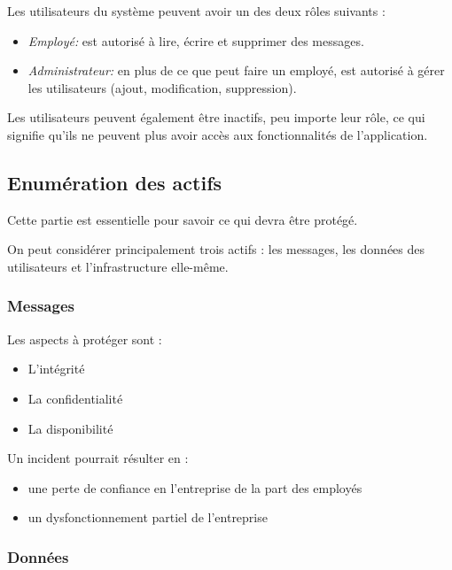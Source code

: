 \documentclass{article}
\begin{document}
Les utilisateurs du système peuvent avoir un des deux rôles suivants :

\begin{itemize}

\item
  \textit{Employé:} est autorisé à lire, écrire et supprimer des
  messages.
\item
  \textit{Administrateur:} en plus de ce que peut faire un employé, est
  autorisé à gérer les utilisateurs (ajout, modification, suppression).
\end{itemize}

Les utilisateurs peuvent également être inactifs, peu importe leur rôle,
ce qui signifie qu'ils ne peuvent plus avoir accès aux fonctionnalités
de l'application.

\subsection{Enumération des actifs}

Cette partie est essentielle pour savoir ce qui devra être protégé.

On peut considérer principalement trois actifs : les messages, les
données des utilisateurs et l'infrastructure elle-même.

\subsubsection{Messages}

Les aspects à protéger sont :

\begin{itemize}

\item
  L'intégrité
\item
  La confidentialité
\item
  La disponibilité
\end{itemize}

Un incident pourrait résulter en :

\begin{itemize}

\item
  une perte de confiance en l'entreprise de la part des employés
\item
  un dysfonctionnement partiel de l'entreprise
\end{itemize}

\subsubsection{Données}
\end{document}
